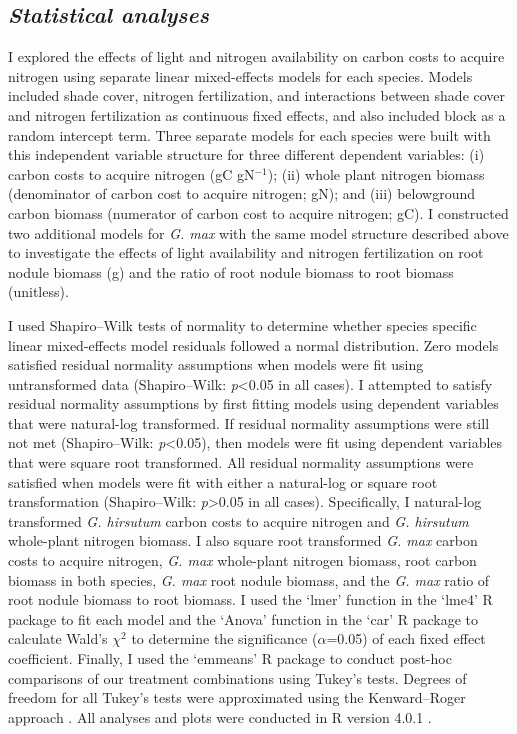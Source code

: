 \subsection{\textit{Statistical analyses}}
\noindent I explored the effects of light and nitrogen availability on carbon costs to acquire nitrogen using separate linear mixed-effects models for each species. Models included shade cover, nitrogen fertilization, and interactions between shade cover and nitrogen fertilization as continuous fixed effects, and also included block as a random intercept term. Three separate models for each species were built with this independent variable structure for three different dependent variables: (i) carbon costs to acquire nitrogen (gC gN$^{-1}$); (ii) whole plant nitrogen biomass (denominator of carbon cost to acquire nitrogen; gN); and (iii) belowground carbon biomass (numerator of carbon cost to acquire nitrogen; gC). I constructed two additional models for \textit{G. max} with the same model structure described above to investigate the effects of light availability and nitrogen fertilization on root nodule biomass (g) and the ratio of root nodule biomass to root biomass (unitless).

I used Shapiro–Wilk tests of normality to determine whether species specific linear mixed-effects model residuals followed a normal distribution. Zero models satisfied residual normality assumptions when models were fit using untransformed data (Shapiro–Wilk: \textit{p}<0.05 in all cases). I attempted to satisfy residual normality assumptions by first fitting models using dependent variables that were natural-log transformed. If residual normality assumptions were still not met (Shapiro–Wilk: \textit{p}<0.05), then models were fit using dependent variables that were square root transformed. All residual normality assumptions were satisfied when models were fit with either a natural-log or square root transformation (Shapiro–Wilk: \textit{p}>0.05 in all cases). Specifically, I natural-log transformed \textit{G. hirsutum} carbon costs to acquire nitrogen and \textit{G. hirsutum} whole-plant nitrogen biomass. I also square root transformed \textit{G. max} carbon costs to acquire nitrogen, \textit{G. max} whole-plant nitrogen biomass, root carbon biomass in both species, \textit{G. max} root nodule biomass, and the \textit{G. max} ratio of root nodule biomass to root biomass. I used the `lmer’ function in the `lme4’ R package  to fit each model and the `Anova’ function in the `car’ R package  to calculate Wald’s $\chi^{2}$ to determine the significance ($\alpha$=0.05) of each fixed effect coefficient. Finally, I used the `emmeans’ R package  to conduct post-hoc comparisons of our treatment combinations using Tukey’s tests. Degrees of freedom for all Tukey’s tests were approximated using the Kenward–Roger approach . All analyses and plots were conducted in R version 4.0.1 .


